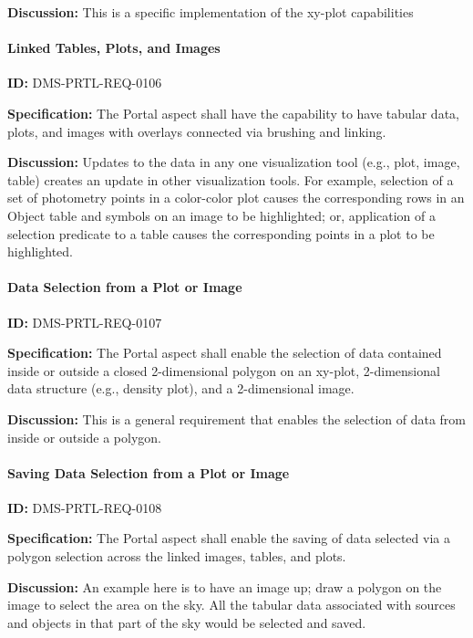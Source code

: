\documentclass[SE,toc]{lsstdoc}
\begin{document}
\textbf{Discussion:}
This is a specific implementation of the xy-plot capabilities

\paragraph{Linked Tables, Plots, and Images}\hfill  %

\label{DMS-PRTL-REQ-0106}
\textbf{ID:} DMS-PRTL-REQ-0106

\textbf{Specification:}
The Portal aspect shall have the capability to have tabular data, plots, and images with overlays connected via brushing and linking.

\textbf{Discussion:}
Updates to the data in any one visualization tool (e.g., plot, image, table) creates an update in other visualization tools.  For example, selection of a set of photometry points in a color-color plot causes the corresponding rows in an Object table and symbols on an image to be highlighted; or, application of a selection predicate to a table causes the corresponding points in a plot to be highlighted.

\paragraph{Data Selection from a Plot or Image}\hfill  %

\label{DMS-PRTL-REQ-0107}
\textbf{ID:} DMS-PRTL-REQ-0107

\textbf{Specification:}
The Portal aspect shall enable the selection of data contained inside or outside a closed 2-dimensional polygon on an xy-plot, 2-dimensional data structure (e.g., density plot), and a 2-dimensional image.

\textbf{Discussion:}
This is a general requirement that enables the selection of data from inside or outside a polygon.

\paragraph{Saving Data Selection from a Plot or Image}\hfill  %

\label{DMS-PRTL-REQ-0108}
\textbf{ID:} DMS-PRTL-REQ-0108

\textbf{Specification:}
The Portal aspect shall enable the saving of data selected via a polygon selection across the linked images, tables, and plots.

\textbf{Discussion:}
An example here is to have an image up; draw a polygon on the image to select the area on the sky.  All the tabular data associated with sources and objects in that part of the sky would be selected and saved.
\end{document}
